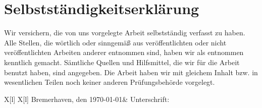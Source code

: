 \section*{Selbstständigkeitserklärung}

Wir versichern, die von uns vorgelegte Arbeit selbstständig verfasst zu haben. Alle Stellen, die wörtlich oder sinngemäß aus veröffentlichten oder nicht veröffentlichten Arbeiten anderer entnommen sind, 
haben wir als entnommen kenntlich gemacht. Sämtliche Quellen und Hilfsmittel, die wir für die Arbeit benutzt haben, sind angegeben. Die Arbeit haben wir mit gleichem Inhalt bzw. in wesentlichen 
Teilen noch keiner anderen Prüfungsbehörde vorgelegt.

\vspace*{1cm}

\begin{tblr}{X[l] X[l]}
Bremerhaven, den \today & Unterschrift:\\
\end{tblr}